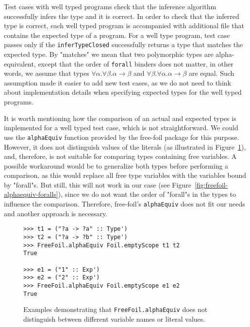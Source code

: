 Test cases with well typed programs check that the inference algorithm successfully infers the type and it is correct. In order to check that the inferred type is correct, each well typed program is accompanied with additional file that contains the expected type of a program. For a well type program, test case passes only if the \texttt{inferTypeClosed} successfully returns a type that matches the expected type. By "matches" we mean that two polymorphic types are alpha-equivalent, except that the order of \texttt{forall} binders does not matter, in other words, we assume that types $\forall \alpha. \forall \beta. \alpha \to \beta$ and $\forall \beta. \forall \alpha. \alpha \to \beta$ are equal. Such assumption made it easier to add new test cases, as we do not need to think about implementation details when specifying expected types for the well typed programs.

It is worth mentioning how the comparison of an actual and expected types is implemented for a well typed test case, which is not straightforward. We could use the \texttt{alphaEquiv} function provided by the free-foil package for this purpose. However, it does not distinguish values of the literals (as illustrated in Figure~\ref{fig:freefoil-alphaequiv-literals}), and, therefore, is not suitable for comparing types containing free variables. A possible workaround would be to generalize both types before performing a comparison, as this would replace all free type variables with the variables bound by "forall"s. But still, this will not work in our case (see Figure~\ref{fig:freefoil-alphaequiv-foralls}), since we do not want the order of "forall"s in the types to influence the comparison. Therefore, free-foil's \texttt{alphaEquiv} does not fit our needs and another approach is necessary.

\begin{figure}[H]
  \begin{verbatim}
>>> t1 = ("?a -> ?a" :: Type')
>>> t2 = ("?a -> ?b" :: Type')
>>> FreeFoil.alphaEquiv Foil.emptyScope t1 t2
True

>>> e1 = ("1" :: Exp')
>>> e2 = ("2" :: Exp')
>>> FreeFoil.alphaEquiv Foil.emptyScope e1 e2
True
  \end{verbatim}
  \caption[\texttt{FreeFoil.alphaEquiv} usage examples (1)]{Examples demonstrating that \texttt{FreeFoil.alphaEquiv} does not distinguish between different variable names or literal values.}
  \label{fig:freefoil-alphaequiv-literals}
\end{figure}


